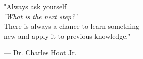 \cleardoublepage{\thispagestyle{empty}}  %
\thispagestyle{empty}

\vspace*{\fill}

\begin{singlespace}

\begin{LARGE}
    
    \vspace*{-1.3\baselineskip}
    \begin{center}
        "Always ask yourself\\
        \textit{'What is the next step?'}\\
        There is always a chance to learn something\\
        new and apply it to previous knowledge."
    \end{center}
    \vspace*{-1.3\baselineskip}
    
\end{LARGE}

\vspace{1cm}

\begin{large}
    \hspace*{7cm} --- Dr. Charles Hoot Jr.
\end{large}

\end{singlespace}

\vspace*{\fill}